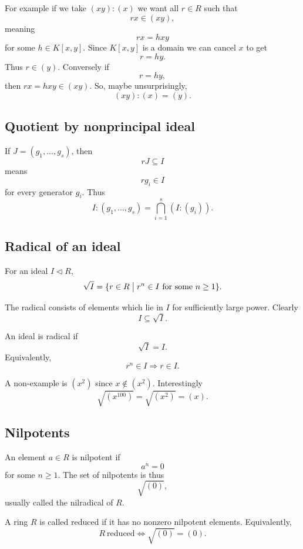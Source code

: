 \documentclass[11pt]{article}
\begin{document}
For example if we take $(xy) : (x)$ we want all 
$r \in R$ such that 
\[
    rx \in (xy),
\]
meaning 
\[
    rx = hxy
\]
for some $h \in K[x,y]$. 
Since $K[x,y]$ is a domain we can cancel $x$ to get 
\[
    r = hy. 
\]
Thus $r \in (y)$. Conversely if 
\[
    r = hy, 
\]
then $rx = hxy \in (xy)$. 
So, maybe unsurprisingly, 
\[
    (xy) : (x) = (y).
\]

\subsection{Quotient by nonprincipal ideal}
If $J = (g_1,\ldots,g_s)$, then 
\[
    rJ \subseteq I
\]
means 
\[
    rg_i \in I
\]
for every generator $g_i$. 
Thus 
\[
    I : (g_1,\ldots,g_s) = \bigcap_{i=1}^s (I:(g_i)). 
\]

\subsection{Radical of an ideal}
\begin{defn}
    For an ideal $I \triangleleft R$, 
    \[
        \sqrt I = \{r \in R \bigm| r^n \in I \ \text{for some} \ 
        n \geq 1\}.
    \]
\end{defn}
The radical consists of elements which lie in $I$ for sufficiently 
large power. Clearly 
\[
    I \subseteq \sqrt I.
\]

\begin{defn}
    An ideal is radical if 
    \[
        \sqrt I = I. 
    \]
    Equivalently, 
    \[
        r^n \in I \Rightarrow r \in I. 
    \]
\end{defn}

A non-example is $(x^2)$ since $x \not\in (x^2)$. 
Interestingly 
\[
    \sqrt{(x^{100})} = \sqrt{(x^2)} = (x).
\]

\subsection{Nilpotents}

\begin{defn}
    An element $a \in R$ is nilpotent if 
    \[
        a^n = 0
    \]
    for some $n \geq 1$. 
    The set of nilpotents is thus 
    \[
        \sqrt{(0)},
    \]
    usually called the nilradical of $R$.

    A ring $R$ is called reduced if it has no nonzero nilpotent 
    elements. Equivalently, 
    \[
        R \ \text{reduced} \Leftrightarrow \sqrt{(0)} = (0).
    \]
\end{defn}
\end{document}
